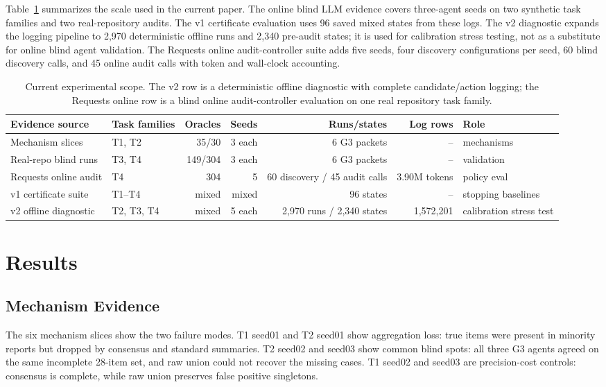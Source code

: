 \documentclass[letterpaper]{article}
\begin{document}
Table~\ref{tab:data-volume} summarizes the scale used in the current paper. The
online blind LLM evidence covers three-agent seeds on two synthetic task
families and two real-repository audits. The v1 certificate evaluation uses 96
saved mixed states from these logs. The v2 diagnostic expands the logging
pipeline to 2,970 deterministic offline runs and 2,340 pre-audit states; it is
used for calibration stress testing, not as a substitute for online blind agent
validation.
The Requests online audit-controller suite adds five seeds, four discovery
configurations per seed, 60 blind discovery calls, and 45 online audit calls
with token and wall-clock accounting.

\begin{table}[t]
\centering
\small
\begin{tabular}{llrrrrl}
\toprule
Evidence source & Task families & Oracles & Seeds & Runs/states & Log rows & Role \\
\midrule
Mechanism slices & T1, T2 & 35/30 & 3 each & 6 G3 packets & -- &
mechanisms \\
Real-repo blind runs & T3, T4 & 149/304 & 3 each & 6 G3 packets & -- &
validation \\
Requests online audit & T4 & 304 & 5 & 60 discovery / 45 audit calls &
3.90M tokens & policy eval \\
v1 certificate suite & T1--T4 & mixed & mixed & 96 states & -- &
stopping baselines \\
v2 offline diagnostic & T2, T3, T4 & mixed & 5 each & 2,970 runs / 2,340 states &
1,572,201 & calibration stress test \\
\bottomrule
\end{tabular}
\caption{Current experimental scope. The v2 row is a deterministic offline
diagnostic with complete candidate/action logging; the Requests online row is a
blind online audit-controller evaluation on one real repository task family.}
\label{tab:data-volume}
\end{table}

\section{Results}

\subsection{Mechanism Evidence}

The six mechanism slices show the two failure modes. T1 seed01 and
T2 seed01 show aggregation loss: true items were present in minority reports but
dropped by consensus and standard summaries. T2 seed02 and seed03 show common
blind spots: all three G3 agents agreed on the same incomplete 28-item set, and
raw union could not recover the missing cases. T1 seed02 and seed03 are
precision-cost controls: consensus is complete, while raw union preserves false
positive singletons.
\end{document}
